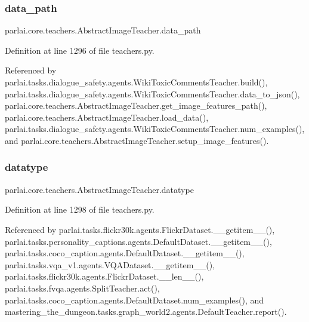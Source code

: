 \subsubsection{\texorpdfstring{data\+\_\+path}{data\_path}}
{\footnotesize\ttfamily parlai.\+core.\+teachers.\+Abstract\+Image\+Teacher.\+data\+\_\+path}



Definition at line 1296 of file teachers.\+py.



Referenced by parlai.\+tasks.\+dialogue\+\_\+safety.\+agents.\+Wiki\+Toxic\+Comments\+Teacher.\+build(), parlai.\+tasks.\+dialogue\+\_\+safety.\+agents.\+Wiki\+Toxic\+Comments\+Teacher.\+data\+\_\+to\+\_\+json(), parlai.\+core.\+teachers.\+Abstract\+Image\+Teacher.\+get\+\_\+image\+\_\+features\+\_\+path(), parlai.\+core.\+teachers.\+Abstract\+Image\+Teacher.\+load\+\_\+data(), parlai.\+tasks.\+dialogue\+\_\+safety.\+agents.\+Wiki\+Toxic\+Comments\+Teacher.\+num\+\_\+examples(), and parlai.\+core.\+teachers.\+Abstract\+Image\+Teacher.\+setup\+\_\+image\+\_\+features().

\mbox{\label{classparlai_1_1core_1_1teachers_1_1AbstractImageTeacher_a335cba069093a1e1cff8f73fad9f11d1}} 
\subsubsection{\texorpdfstring{datatype}{datatype}}
{\footnotesize\ttfamily parlai.\+core.\+teachers.\+Abstract\+Image\+Teacher.\+datatype}



Definition at line 1298 of file teachers.\+py.



Referenced by parlai.\+tasks.\+flickr30k.\+agents.\+Flickr\+Dataset.\+\_\+\+\_\+getitem\+\_\+\+\_\+(), parlai.\+tasks.\+personality\+\_\+captions.\+agents.\+Default\+Dataset.\+\_\+\+\_\+getitem\+\_\+\+\_\+(), parlai.\+tasks.\+coco\+\_\+caption.\+agents.\+Default\+Dataset.\+\_\+\+\_\+getitem\+\_\+\+\_\+(), parlai.\+tasks.\+vqa\+\_\+v1.\+agents.\+V\+Q\+A\+Dataset.\+\_\+\+\_\+getitem\+\_\+\+\_\+(), parlai.\+tasks.\+flickr30k.\+agents.\+Flickr\+Dataset.\+\_\+\+\_\+len\+\_\+\+\_\+(), parlai.\+tasks.\+fvqa.\+agents.\+Split\+Teacher.\+act(), parlai.\+tasks.\+coco\+\_\+caption.\+agents.\+Default\+Dataset.\+num\+\_\+examples(), and mastering\+\_\+the\+\_\+dungeon.\+tasks.\+graph\+\_\+world2.\+agents.\+Default\+Teacher.\+report().

